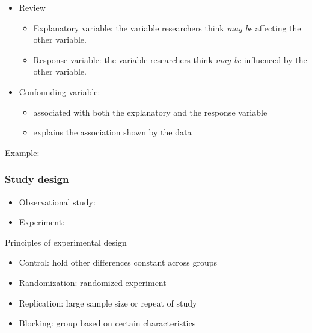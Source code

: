 \documentclass[
]{report}
\providecommand{\tightlist}{%
  \setlength{\itemsep}{0pt}\setlength{\parskip}{0pt}}
\begin{document}
\begin{itemize}
\item
  Review

  \begin{itemize}
  \item
    Explanatory variable: the variable researchers think \emph{may be} affecting the other variable.
  \item
    Response variable: the variable researchers think \emph{may be} influenced by the other variable.
  \end{itemize}
\item
  Confounding variable:

  \begin{itemize}
  \tightlist
  \item
    associated with both the explanatory and the response variable
  \item
    explains the association shown by the data
  \end{itemize}
\end{itemize}

Example:

\vspace{0.8in}

\subsubsection*{Study design}\label{study-design-1}

\begin{itemize}
\tightlist
\item
  Observational study:
\end{itemize}

\vspace{0.5in}

\begin{itemize}
\tightlist
\item
  Experiment:
\end{itemize}

\vspace{0.5in}

Principles of experimental design

\begin{itemize}
\item
  Control: hold other differences constant across groups
  \vspace{1mm}
\item
  Randomization: randomized experiment
  \vspace{1mm}
\item
  Replication: large sample size or repeat of study
  \vspace{1mm}
\item
  Blocking: group based on certain characteristics
  \vspace{1mm}
\end{itemize}
\end{document}
